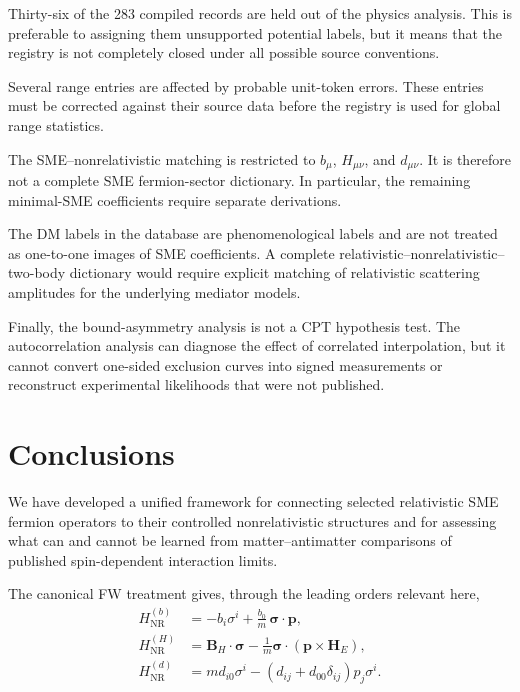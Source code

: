 \documentclass[aps,prd,reprint,superscriptaddress,nofootinbib]{revtex4-2}
\newcommand{\NR}{\mathrm{NR}}
\begin{document}
	Thirty-six of the 283 compiled records are held out of the physics analysis. This is preferable to assigning them unsupported potential
	labels, but it means that the registry is not completely closed under
	all possible source conventions.
	
	Several range entries are affected by probable unit-token errors. These
	entries must be corrected against their source data before the registry
	is used for global range statistics.
	
	The SME--nonrelativistic matching is restricted to
	$b_\mu$, $H_{\mu\nu}$, and $d_{\mu\nu}$. It is therefore not a complete
	SME fermion-sector dictionary. In particular, the remaining minimal-SME
	coefficients require separate derivations.
	
	The DM labels in the database are phenomenological labels and are not
	treated as one-to-one images of SME coefficients. A complete
	relativistic--nonrelativistic--two-body dictionary would require explicit
	matching of relativistic scattering amplitudes for the underlying
	mediator models.
	
	Finally, the bound-asymmetry analysis is not a CPT hypothesis test.
	The autocorrelation analysis can diagnose the effect of correlated
	interpolation, but it cannot convert one-sided exclusion curves into
	signed measurements or reconstruct experimental likelihoods that were
	not published.
	
	\section{Conclusions}
	
	We have developed a unified framework for connecting selected
	relativistic SME fermion operators to their controlled
	nonrelativistic structures and for assessing what can and cannot be
	learned from matter--antimatter comparisons of published
	spin-dependent interaction limits.
	
	The canonical FW treatment gives, through the leading orders relevant
	here,
	\begin{align}
		H_{\NR}^{(b)}
		&=
		-b_i\sigma^i
		+\frac{b_0}{m}\,
		\boldsymbol{\sigma}\cdot\mathbf p,
		\label{eq:summaryb}
		\\
		H_{\NR}^{(H)}
		&=
		\mathbf B_H\cdot\boldsymbol{\sigma}
		-\frac{1}{m}
		\boldsymbol{\sigma}\cdot
		(\mathbf p\times\mathbf H_E),
		\label{eq:summaryH}
		\\
		H_{\NR}^{(d)}
		&=
		m d_{i0}\sigma^i
		-
		(d_{ij}+d_{00}\delta_{ij})p_j\sigma^i .
		\label{eq:summaryd}
	\end{align}
	
\end{document}
